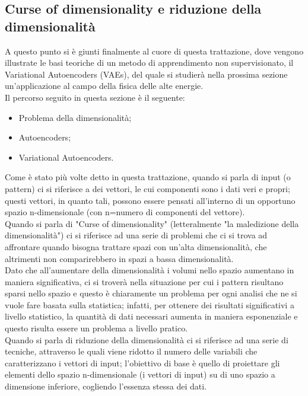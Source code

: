 \newpage


\subsection{Curse of dimensionality e riduzione della dimensionalità}
\label{curse_dim}

A questo punto si è giunti finalmente al cuore di questa trattazione, dove vengono illustrate le basi teoriche di un metodo di apprendimento non supervisionato, il Variational Autoencoders (VAEs), del quale si studierà nella prossima sezione un'applicazione al campo della fisica delle alte energie. \\
Il percorso seguito in questa sezione è il seguente:
\begin{itemize}
	\item Problema della dimensionalità;
	\item Autoencoders;
	\item Variational Autoencoders.
\end{itemize}
Come è stato più volte detto in questa trattazione, quando si parla di input (o pattern) ci si riferisce a dei vettori, le cui componenti sono i dati veri e propri; questi vettori, in quanto tali, possono essere pensati all'interno di un opportuno spazio n-dimensionale (con n=numero di componenti del vettore).\\
Quando si parla di "Curse of dimensionality" (letteralmente "la maledizione della dimensionalità") ci si riferisce ad una serie di problemi che ci si trova ad affrontare quando bisogna trattare spazi con un'alta dimensionalità, che altrimenti non comparirebbero in spazi a bassa dimensionalità.  \\
Dato che all'aumentare della dimensionalità i volumi nello spazio aumentano in maniera significativa, ci si troverà nella situazione per cui i pattern risultano sparsi nello spazio e questo è chiaramente un problema per ogni analisi che ne si vuole fare basata sulla statistica; infatti, per ottenere dei risultati significativi a livello statistico, la quantità di dati necessari aumenta in maniera esponenziale e questo risulta essere un problema a livello pratico. \\
Quando si parla di riduzione della dimensionalità ci si riferisce ad una serie di tecniche, attraverso le quali viene ridotto il numero delle variabili che caratterizzano i vettori di input; l'obiettivo di base è quello di proiettare gli elementi dello spazio n-dimensionale (i vettori di input) su di uno spazio a dimensione inferiore, cogliendo l'essenza stessa dei dati.\\

